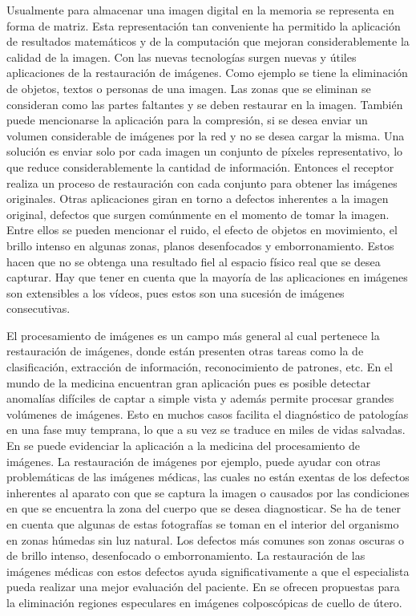 \begin{introduction}
Usualmente para almacenar una imagen digital en la memoria se representa en forma de matriz. Esta representaci\'on tan conveniente ha permitido la aplicaci\'on de resultados matem\'aticos y de la computaci\'on que mejoran considerablemente la calidad de la imagen. Con las nuevas tecnolog\'ias surgen nuevas y \'utiles aplicaciones de la restauraci\'on de im\'agenes. Como ejemplo se tiene la eliminaci\'on de objetos, textos o personas de una imagen. Las zonas que se eliminan se consideran como las partes faltantes y se deben restaurar en la imagen. También puede mencionarse la aplicaci\'on para la compresi\'on, si se desea enviar un volumen considerable de imágenes por la red y no se desea cargar la misma. Una solución es enviar solo por cada imagen un conjunto de p\'ixeles representativo, lo que reduce considerablemente la cantidad de informaci\'on. Entonces el receptor realiza un proceso de restauraci\'on con cada conjunto para obtener las imágenes originales. Otras aplicaciones giran en torno a defectos inherentes a la imagen original, defectos que surgen comúnmente en el momento de tomar la imagen. Entre ellos se pueden mencionar el ruido, el efecto de objetos en movimiento, el brillo intenso en algunas zonas, planos desenfocados y emborronamiento. Estos hacen que no se obtenga una resultado fiel al espacio físico real que se desea capturar. Hay que tener en cuenta que la mayor\'ia de las aplicaciones en im\'agenes son extensibles a los vídeos, pues estos son una sucesión de imágenes consecutivas. 

El procesamiento de im\'agenes es un campo m\'as general al cual pertenece la restauraci\'on de im\'agenes, donde est\'an presenten otras tareas como la de clasificaci\'on, extracci\'on de informaci\'on, reconocimiento de patrones, etc. En el mundo de la medicina encuentran gran aplicaci\'on pues es posible detectar anomalías difíciles de captar a simple vista y adem\'as permite procesar grandes volúmenes de imágenes. Esto en muchos casos facilita el diagn\'ostico de patologías en una fase muy temprana, lo que a su vez se traduce en miles de vidas salvadas. En \cite{afals2016tesis} se puede evidenciar la aplicaci\'on a la medicina del procesamiento de im\'agenes. La restauraci\'on de im\'agenes por ejemplo, puede ayudar con otras problemáticas de las im\'agenes m\'edicas, las cuales no est\'an exentas de los defectos inherentes al aparato con que se captura la imagen o causados por las condiciones en que se encuentra la zona del cuerpo que se desea diagnosticar. Se ha de tener en cuenta que algunas de estas fotograf\'ias se toman en el interior del organismo en zonas h\'umedas sin luz natural. Los defectos m\'as comunes son zonas oscuras o de brillo intenso, desenfocado o emborronamiento. La restauración de las imágenes médicas con estos defectos ayuda significativamente a que el especialista pueda realizar una mejor evaluación del paciente. En \cite{dgomez2018tesis,apalmer2015tesis} se ofrecen propuestas para la eliminaci\'on regiones especulares en imágenes colposcópicas de cuello de útero.


\end{introduction}
